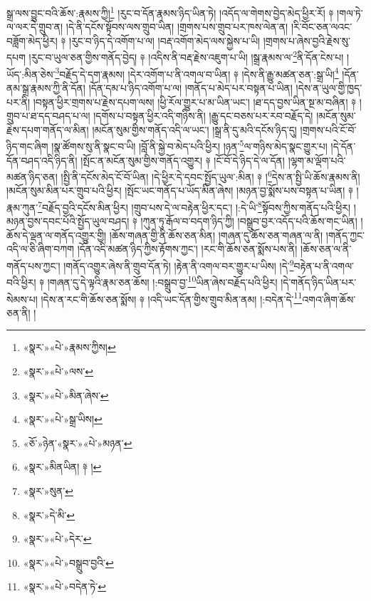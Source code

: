 སྒྲ་ལས་བྱུང་བའི་ཆོས་:རྣམས་ཀྱི།\footnote{«སྣར་»«པེ་»རྣམས་ཀྱིས།} །རུང་བ་དོན་རྣམས་ཉིད་ཡིན་ཏེ། །འདོད་ལ་གེགས་བྱེད་མེད་ཕྱིར་རོ། ༈ །གལ་ཏེ་ལ་ལར་དེ་གྲུབ་ན། །དེ་ནི་དངོས་སྟོབས་ལས་གྲུབ་ཡིན། །གྲགས་པས་གྲུབ་པར་ཁས་ལེན་ན། །རི་བོང་ཅན་ལའང་བཟློག་མེད་ཕྱིར། ༈ །རུང་བ་ཉིད་དེ་འགོག་པ་ལ། །བརྡ་འགོག་མེད་ལས་སྐྱེས་པ་ཡི། །གྲགས་པ་ཞེས་བྱའི་རྗེས་སུ་དཔག །རུང་བ་ཡུལ་ཅན་གྱིས་གནོད་བྱེད། ༈ །འདིས་ནི་བརྡ་རྗེས་འཇུག་པ་ཡི། །སྒྲ་རྣམས་ལ་\footnote{«སྣར་»«པེ་»ལས་}ནི་དོན་ངེས་པ། །ཡོད་:མིན་ཅེས་\footnote{«སྣར་»«པེ་»མིན་ཞེས་}བརྗོད་དེ་དག་རྣམས། །དེར་འགོག་པ་ནི་འགལ་བ་ཡིན། ༈ །དེས་ནི་རྒྱུ་མཚན་ཅན་:སྒྲ་ཡི།\footnote{«སྣར་»«པེ་»སྒྲ་ཡིས།} །དོན་ནམ་སྒྲ་རྣམས་ཀྱི་ནི་དོན། །དོན་དམ་པ་ཉིད་འགོག་པ་ལ། །གནོད་པ་མེད་པར་བསྟན་པ་ཡིན། །དེས་ན་ཡུལ་གྱི་ཁྱད་པར་ནི། །བསྟན་ཕྱིར་གྲགས་པ་རྗེས་དཔག་ལས། །ཕྱི་རོལ་གྱུར་པ་མ་ཡིན་ཡང་། །ཐ་དད་བྱས་ཡིན་སྔ་མ་བཞིན། ༈ །གྲུབ་པ་ཐ་དད་བཤད་པ་ལ། །དགོས་པ་བསྟན་ཕྱིར་འདི་གཉིས་ནི། །རྒྱུ་དང་བཅས་པར་རབ་བརྗོད་དེ། །མངོན་སུམ་རྗེས་དཔག་གནོད་ལ་མིན། །མངོན་སུམ་གྱིས་གནོད་འདི་ལ་ཡང་། །སྒྲ་ནི་དུ་མའི་དངོས་ཉིད་དུ། །གྲགས་པའི་ངོ་བོ་ཉིད་གང་ཞིག །སྣ་ཚོགས་སུ་ནི་སྣང་བ་ཡི། །བློ་ནི་སྐྱེ་བ་མེད་པའི་ཕྱིར། །ཉན་\footnote{«ཅོ་»ཉེན་«སྣར་»«པེ་»མཉན་}ལ་གཉིས་མེད་སྣང་གྱུར་པ། །དེ་དོན་དོན་བཤད་འདི་ཉིད་ནི། །སྤོང་ན་མངོན་སུམ་གྱིས་གནོད་འགྱུར། ༈ །ངོ་བོ་དེ་ཉིད་དེ་ལ་དོན། །ལྷག་མ་ལྡོག་པའི་མཚན་ཉིད་ཅན། །སྤྱི་ནི་དངོས་མེད་ངོ་བོ་ཡིན། །དེ་ཕྱིར་དེ་དབང་སྤྱོད་ཡུལ་:མིན། ༈ །\footnote{«སྣར་»མིནཡིན། ༈ །}དེས་ན་སྤྱི་ཡི་ཆོས་རྣམས་ནི། །མངོན་སུམ་མིན་པར་གྲུབ་པའི་ཕྱིར། །སྤོང་ཡང་གནོད་པ་ཡོད་མིན་ཞེས། །མཉན་བྱ་སྨོས་པས་བསྟན་པ་ཡིན། ༈ །རྣམ་ཀུན་\footnote{«སྣར་»སུན་}བརྗོད་བྱའི་དངོས་མིན་ཕྱིར། །གྲུབ་པས་དེ་ལ་བརྟེན་ཕྱིར་དང་། །:དེ་ཡི་\footnote{«སྣར་»དེ་མི་}སྟོབས་ཀྱིས་གནོད་པའི་ཕྱིར། །མཉན་བྱས་དབང་པོའི་སྤྱོད་ཡུལ་བཤད། ༈ །ཀུན་ཏུ་རྒོལ་བ་བདག་ཉིད་ཀྱི། །བསྒྲུབ་བྱར་འདོད་པའི་ཆོས་གང་ཡིན། །ཆོས་དེ་ལྡན་ལ་གནོད་འགྱུར་གྱི། །ཆོས་གཞན་གྱི་ནི་ཆོས་ཅན་མིན། །གཞན་དུ་ཆོས་ཅན་གཞན་ལ་ནི། །གནོད་ཀྱང་འདི་ལ་ཅི་ཞིག་བཀག །དོན་འདི་མཚན་ཉིད་ཀྱིས་རྟོགས་ཀྱང་། །རང་གི་ཆོས་ཅན་སྨོས་པས་ནི། །ཆོས་ཅན་ལ་ནི་གནོད་པས་ཀྱང་། །གནོད་འགྱུར་ཞེས་ནི་གྲུབ་དོན་ཏེ། །རྟེན་ནི་འགལ་བར་གྱུར་པ་ཡིས། །དེ་\footnote{«སྣར་»«པེ་»དེར་}བརྟེན་པ་ནི་འགལ་བའི་ཕྱིར། ༈ །གཞན་དུ་དེ་ལྟའི་རྣམ་ཅན་ཆོས། །:བསྒྲུབ་བྱ་\footnote{«སྣར་»«པེ་»བསྒྲུབ་བྱའི་}ཡིན་ཞེས་བརྗོད་པའི་ཕྱིར། །དེ་གནོད་ཉིད་ཡིན་པར་སེམས་པ། །དེས་ན་རང་གི་ཆོས་ཅན་སྨོས། ༈ །འདི་ཡང་དོན་གྱིས་གྲུབ་མིན་ནམ། །:བདེན་དེ་\footnote{«སྣར་»«པེ་»བདེན་ཏེ་}འགའ་ཞིག་ཆོས་ཅན་ནི། །
